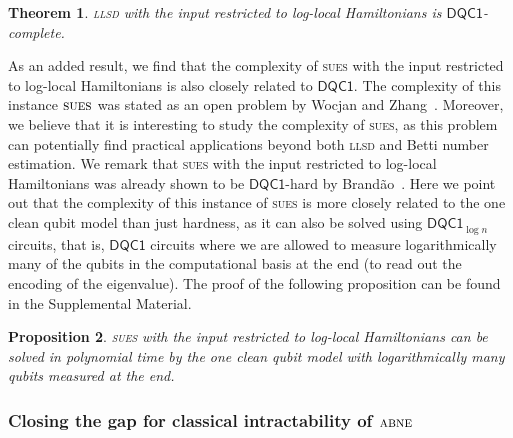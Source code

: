 \documentclass[a4paper, onecolumn, accepted=2022-08-28]{quantumarticle}
\newtheorem{theorem}{Theorem}
\newtheorem{proposition}[theorem]{Proposition}
\begin{document}
\begin{theorem}
  \textsc{llsd} with the input restricted to log-local Hamiltonians is $\mathsf{DQC1}$-complete.
  \label{theorem:complete}
\end{theorem}

As an added result, we find that the complexity of \textsc{sues} with the input restricted to log-local Hamiltonians is also closely related to $\mathsf{DQC1}$.
The complexity of this instance $\textsc{sues}$ was stated as an open problem by Wocjan and Zhang~\cite{wocjan:bqp_complete}.
Moreover, we believe that it is interesting to study the complexity of \textsc{sues}, as this problem can potentially find practical applications beyond both \textsc{llsd} and Betti number estimation.
We remark that \textsc{sues} with the input restricted to log-local Hamiltonians was already shown to be $\mathsf{DQC1}$-hard by Brand\~ao~\cite{brandao:thesis}.
Here we point out that the complexity of this instance of \textsc{sues} is more closely related to the one clean qubit model than just hardness, as it can also be solved using $\mathsf{DQC1}_{\log n}$ circuits, that is, $\mathsf{DQC1}$ circuits where we are allowed to measure logarithmically many of the qubits in the computational basis at the end (to read out the encoding of the eigenvalue).
The proof of the following proposition can be found in the Supplemental Material.

\begin{proposition}
  \textsc{sues} with the input restricted to log-local Hamiltonians can be solved in polynomial time by the one clean qubit model with logarithmically many qubits measured at the end.
  \label{prop:sues}
\end{proposition}


\subsubsection{Closing the gap for classical intractability of $\textsc{abne}$
\label{subsubsec:discussion}}
\end{document}
